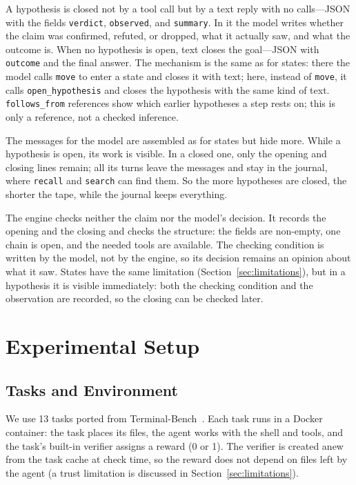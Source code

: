 \documentclass[11pt,a4paper]{article}
\begin{document}
A hypothesis is closed not by a tool call but by a text reply with no calls---JSON with the fields
\texttt{verdict}, \texttt{observed}, and \texttt{summary}. In it the model writes whether the
claim was confirmed, refuted, or dropped, what it actually saw, and what the outcome is. When no
hypothesis is open, text closes the goal---JSON with \texttt{outcome} and the final answer. The
mechanism is the same as for states: there the model calls \texttt{move} to enter a state and
closes it with text; here, instead of \texttt{move}, it calls \texttt{open\_hypothesis} and closes
the hypothesis with the same kind of text. \texttt{follows\_from} references show which earlier
hypotheses a step rests on; this is only a reference, not a checked inference.

The messages for the model are assembled as for states but hide more. While a hypothesis is open,
its work is visible. In a closed one, only the opening and closing lines remain; all its turns
leave the messages and stay in the journal, where \texttt{recall} and \texttt{search} can find
them. So the more hypotheses are closed, the shorter the tape, while the journal keeps everything.

The engine checks neither the claim nor the model's decision. It records the opening and the
closing and checks the structure: the fields are non-empty, one chain is open, and the needed
tools are available. The checking condition is written by the model, not by the engine, so its
decision remains an opinion about what it saw. States have the same limitation
(Section~\ref{sec:limitations}), but in a hypothesis it is visible immediately: both the checking
condition and the observation are recorded, so the closing can be checked later.

\section{Experimental Setup}

\subsection{Tasks and Environment}

We use 13 tasks ported from Terminal-Bench~\cite{terminalbench}. Each task runs in a Docker
container: the task places its files, the agent works with the shell and tools, and the task's
built-in verifier assigns a reward (0 or 1). The verifier is created anew from the task cache
at check time, so the reward does not depend on files left by the agent (a trust limitation is
discussed in Section~\ref{sec:limitations}).
\end{document}
